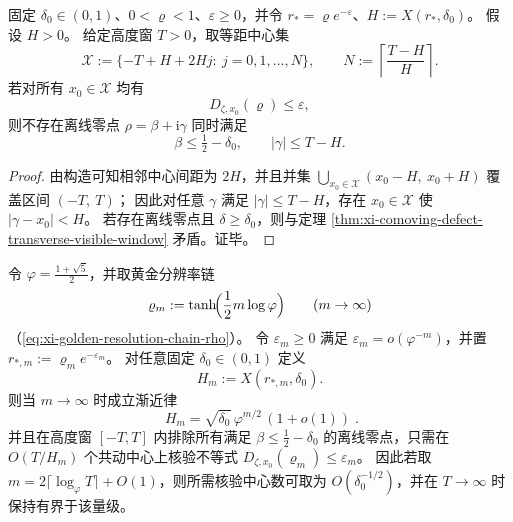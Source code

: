 \begin{corollary}\label{cor:xi-comoving-finite-centers-band-exclusion}
固定 \(\delta_0\in(0,1)\)、\(0<\varrho<1\)、\(\varepsilon\ge 0\)，并令 \(r_\ast=\varrho e^{-\varepsilon}\)、\(H:=X(r_\ast,\delta_0)\)。
假设 \(H>0\)。
给定高度窗 \(T>0\)，取等距中心集
\[
\mathcal X:=\{-T+H+2Hj:\ j=0,1,\dots,N\},
\qquad
N:=\left\lceil\frac{T-H}{H}\right\rceil.
\]
若对所有 \(x_0\in\mathcal X\) 均有
\[
D_{\zeta,x_0}(\varrho)\le \varepsilon,
\]
则不存在离线零点 \(\rho=\beta+\mathrm{i}\gamma\) 同时满足
\[
\beta\le\tfrac12-\delta_0,
\qquad
|\gamma|\le T-H.
\]
\end{corollary}

\begin{proof}
由构造可知相邻中心间距为 \(2H\)，并且并集
\(
\bigcup_{x_0\in\mathcal X}(x_0-H,\ x_0+H)
\)
覆盖区间 \((-T,\ T)\)；
因此对任意 \(\gamma\) 满足 \(|\gamma|\le T-H\)，存在 \(x_0\in\mathcal X\) 使 \(|\gamma-x_0|<H\)。
若存在离线零点且 \(\delta\ge\delta_0\)，则与定理 \ref{thm:xi-comoving-defect-transverse-visible-window} 矛盾。证毕。
\end{proof}

\begin{theorem}[黄金分辨率链上的可见窗增长与覆盖复杂度的标度律]\label{thm:xi-golden-chain-visible-window-growth}
令 \(\varphi=\frac{1+\sqrt5}{2}\)，并取黄金分辨率链
\[
\varrho_m:=\tanh\!\Bigl(\frac12 m\log\varphi\Bigr)\qquad(m\to\infty)
\]
（\eqref{eq:xi-golden-resolution-chain-rho}）。
令 \(\varepsilon_m\ge 0\) 满足 \(\varepsilon_m=o(\varphi^{-m})\)，并置
\(
r_{\ast,m}:=\varrho_m e^{-\varepsilon_m}
\)。
对任意固定 \(\delta_0\in(0,1)\) 定义
\[
H_m:=X(r_{\ast,m},\delta_0).
\]
则当 \(m\to\infty\) 时成立渐近律
\begin{equation}\label{eq:xi-golden-chain-visible-window-growth}
\boxed{\;
H_m=\sqrt{\delta_0}\,\varphi^{m/2}\,(1+o(1))\; }.
\end{equation}
并且在高度窗 \([{-}T,T]\) 内排除所有满足 \(\beta\le\tfrac12-\delta_0\) 的离线零点，只需在 \(O(T/H_m)\) 个共动中心上核验不等式 \(D_{\zeta,x_0}(\varrho_m)\le\varepsilon_m\)。
因此若取 \(m=2\lceil\log_\varphi T\rceil+O(1)\)，则所需核验中心数可取为 \(O(\delta_0^{-1/2})\)，并在 \(T\to\infty\) 时保持有界于该量级。
\end{theorem}

